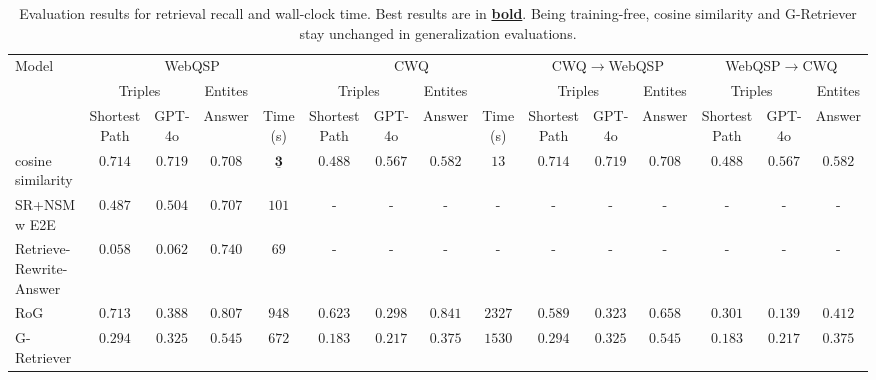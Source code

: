 \begin{table}[t]
\caption{Evaluation results for retrieval recall and wall-clock time. Best results are in \underline{\textbf{bold}}. Being training-free, cosine similarity and G-Retriever stay unchanged in generalization evaluations.}
\vspace{-2mm}
\centering
\begin{adjustbox}{width=\textwidth}
\begin{tabular}{lcccccccccccccc}
\toprule
Model & \multicolumn{4}{c}{WebQSP} & \multicolumn{4}{c}{CWQ} & \multicolumn{3}{c}{CWQ$\rightarrow$WebQSP} & \multicolumn{3}{c}{WebQSP$\rightarrow$CWQ} \\
      \cmidrule(lr){2-5} \cmidrule(lr){6-9}
      \cmidrule(lr){10-12}
      \cmidrule(lr){13-15}
      & \multicolumn{2}{c}{Triples} & Entites & & \multicolumn{2}{c}{Triples} & Entites &
      & \multicolumn{2}{c}{Triples} & Entites &
      \multicolumn{2}{c}{Triples} & Entites \\
      \cmidrule(lr){2-3} \cmidrule(lr){4-4} \cmidrule(lr){6-7} \cmidrule(lr){8-8}
      \cmidrule(lr){10-11}
      \cmidrule(lr){12-12}
      \cmidrule(lr){13-14}
      \cmidrule(lr){15-15}
      & Shortest Path 
      & GPT-4o
      & Answer 
      & Time (s) 
      & Shortest Path 
      & GPT-4o
      & Answer 
      & Time (s)
      & Shortest Path 
      & GPT-4o
      & Answer
      & Shortest Path 
      & GPT-4o
      & Answer\\
\midrule
cosine similarity 
& $0.714$
& $0.719$
& $0.708$
& $\underline{\mathbf{3}}$
& $0.488$
& $0.567$
& $0.582$
& $13$
& $0.714$
& $0.719$
& $0.708$
& $0.488$
& $0.567$
& $0.582$ \\
SR+NSM w E2E 
& $0.487$
& $0.504$ 
& $0.707$
& $101$
& -
& -
& -
& -
& -
& -
& -
& - 
& -
& -\\
Retrieve-Rewrite-Answer 
& $0.058$
& $0.062$
& $0.740$ & $69$
& - & - & - & -
& -
& -
& - 
& -
& - 
& - \\
RoG 
& $0.713$ 
& $0.388$
& $0.807$ & $948$ 
& $0.623$ & $0.298$ & $0.841$ & $2327$
& $0.589$ & $0.323$ & $0.658$
& $0.301$ & $0.139$ & $0.412$\\
G-Retriever
& $0.294$ 
& $0.325$
& $0.545$ 
& $672$ 
& $0.183$
& $0.217$
& $0.375$ 
& $1530$ 
& $0.294$ 
& $0.325$
& $0.545$ 
& $0.183$
& $0.217$
& $0.375$  \\

\end{tabular}
\end{adjustbox}
\end{table}
